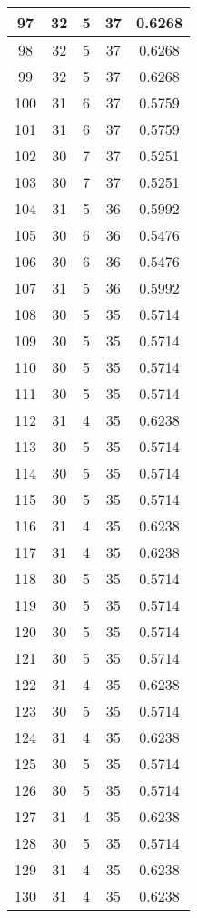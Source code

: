 \documentclass[letterpaper, 12pt]{article}
\begin{document}
\begin{longtable}{|c|c|c|c|c|}
\hline
97 & 32 & 5 & 37 & 0.6268 \\
\hline
98 & 32 & 5 & 37 & 0.6268 \\
\hline
99 & 32 & 5 & 37 & 0.6268 \\
\hline
100 & 31 & 6 & 37 & 0.5759 \\
\hline
101 & 31 & 6 & 37 & 0.5759 \\
\hline
102 & 30 & 7 & 37 & 0.5251 \\
\hline
103 & 30 & 7 & 37 & 0.5251 \\
\hline
104 & 31 & 5 & 36 & 0.5992 \\
\hline
105 & 30 & 6 & 36 & 0.5476 \\
\hline
106 & 30 & 6 & 36 & 0.5476 \\
\hline
107 & 31 & 5 & 36 & 0.5992 \\
\hline
108 & 30 & 5 & 35 & 0.5714 \\
\hline
109 & 30 & 5 & 35 & 0.5714 \\
\hline
110 & 30 & 5 & 35 & 0.5714 \\
\hline
111 & 30 & 5 & 35 & 0.5714 \\
\hline
112 & 31 & 4 & 35 & 0.6238 \\
\hline
113 & 30 & 5 & 35 & 0.5714 \\
\hline
114 & 30 & 5 & 35 & 0.5714 \\
\hline
115 & 30 & 5 & 35 & 0.5714 \\
\hline
116 & 31 & 4 & 35 & 0.6238 \\
\hline
117 & 31 & 4 & 35 & 0.6238 \\
\hline
118 & 30 & 5 & 35 & 0.5714 \\
\hline
119 & 30 & 5 & 35 & 0.5714 \\
\hline
120 & 30 & 5 & 35 & 0.5714 \\
\hline
121 & 30 & 5 & 35 & 0.5714 \\
\hline
122 & 31 & 4 & 35 & 0.6238 \\
\hline
123 & 30 & 5 & 35 & 0.5714 \\
\hline
124 & 31 & 4 & 35 & 0.6238 \\
\hline
125 & 30 & 5 & 35 & 0.5714 \\
\hline
126 & 30 & 5 & 35 & 0.5714 \\
\hline
127 & 31 & 4 & 35 & 0.6238 \\
\hline
128 & 30 & 5 & 35 & 0.5714 \\
\hline
129 & 31 & 4 & 35 & 0.6238 \\
\hline
130 & 31 & 4 & 35 & 0.6238 \\

\end{longtable}
\end{document}
